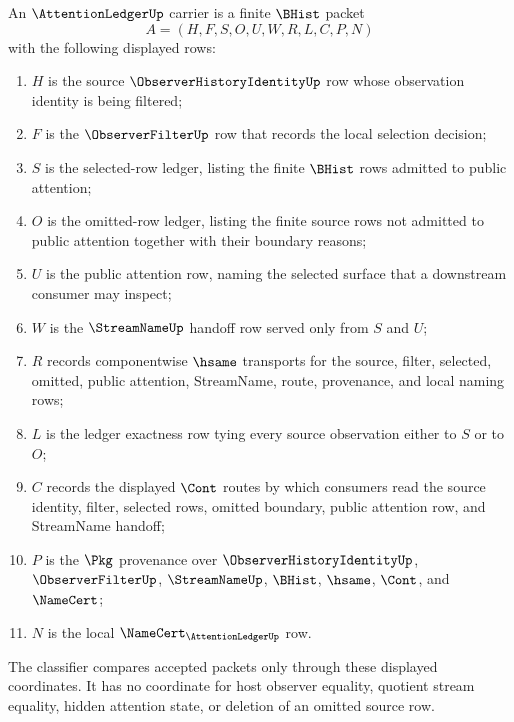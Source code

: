 \begin{definition}
\label{def:attention-ledger-carrier}
An $\AttentionLedgerUp$ carrier is a finite $\BHist$ packet
$$
A=(H,F,S,O,U,W,R,L,C,P,N)
$$
with the following displayed rows:
\begin{enumerate}
\item $H$ is the source $\ObserverHistoryIdentityUp$ row whose observation identity is being filtered;
\item $F$ is the $\ObserverFilterUp$ row that records the local selection decision;
\item $S$ is the selected-row ledger, listing the finite $\BHist$ rows admitted to public attention;
\item $O$ is the omitted-row ledger, listing the finite source rows not admitted to public attention together with their boundary reasons;
\item $U$ is the public attention row, naming the selected surface that a downstream consumer may inspect;
\item $W$ is the $\StreamNameUp$ handoff row served only from $S$ and $U$;
\item $R$ records componentwise $\hsame$ transports for the source, filter, selected, omitted, public attention, StreamName, route, provenance, and local naming rows;
\item $L$ is the ledger exactness row tying every source observation either to $S$ or to $O$;
\item $C$ records the displayed $\Cont$ routes by which consumers read the source identity, filter, selected rows, omitted boundary, public attention row, and StreamName handoff;
\item $P$ is the $\Pkg$ provenance over $\ObserverHistoryIdentityUp$, $\ObserverFilterUp$, $\StreamNameUp$, $\BHist$, $\hsame$, $\Cont$, and $\NameCert$;
\item $N$ is the local $\NameCert_{\AttentionLedgerUp}$ row.
\end{enumerate}
The classifier compares accepted packets only through these displayed coordinates. It has no coordinate for host observer equality, quotient stream equality, hidden attention state, or deletion of an omitted source row.
\end{definition}

